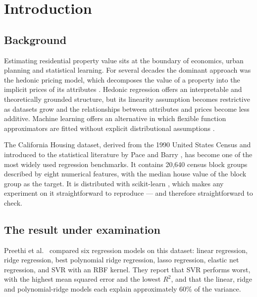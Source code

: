 \documentclass[pdflatex,sn-mathphys-num]{sn-jnl}
\begin{document}

\section{Introduction}\label{sec:intro}

\subsection{Background}
Estimating residential property value sits at the boundary of economics, urban planning and statistical learning. For several decades the dominant approach was the hedonic pricing model, which decomposes the value of a property into the implicit prices of its attributes \cite{rosen1974}. Hedonic regression offers an interpretable and theoretically grounded structure, but its linearity assumption becomes restrictive as datasets grow and the relationships between attributes and prices become less additive. Machine learning offers an alternative in which flexible function approximators are fitted without explicit distributional assumptions \cite{limsombunchai2004,fan2006,park2015}.

The California Housing dataset, derived from the 1990 United States Census and introduced to the statistical literature by Pace and Barry \cite{pace1997}, has become one of the most widely used regression benchmarks. It contains 20{,}640 census block groups described by eight numerical features, with the median house value of the block group as the target. It is distributed with scikit-learn \cite{pedregosa2011}, which makes any experiment on it straightforward to reproduce --- and therefore straightforward to check.

\subsection{The result under examination}\label{sec:the-result}
Preethi et al.\ \cite{preethi2025} compared six regression models on this dataset: linear regression, ridge regression, best polynomial ridge regression, lasso regression, elastic net regression, and SVR with an RBF kernel. They report that SVR performs worst, with the highest mean squared error and the lowest $R^2$, and that the linear, ridge and polynomial-ridge models each explain approximately 60\% of the variance.
\end{document}
